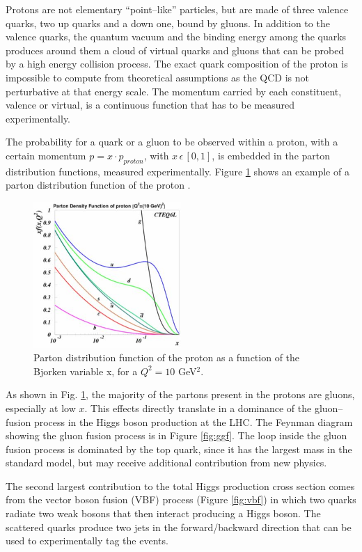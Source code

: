 Protons are not elementary ``point--like'' particles, but are made of three valence quarks, two up quarks and a down one, bound by gluons. In addition to the valence quarks, the quantum vacuum and the binding energy among the quarks produces around them a cloud of virtual quarks and gluons that can be probed by a high energy collision process. The exact quark composition of the proton is impossible to compute from theoretical assumptions as the QCD is not perturbative at that energy scale. The momentum carried by each constituent, valence or virtual, is a continuous function that has to be measured experimentally. 

The probability for a quark or a gluon to be observed within a proton, with a certain momentum $p = x \cdot p_{proton}$, with $x \, \epsilon \, [0,1]$, is embedded in the parton distribution functions, measured experimentally. Figure \ref{fig:pdf} shows an example of a parton distribution function of the proton \cite{Pumplin:2002vw}.

\begin{figure}
\centering
\includegraphics[width=0.5\textwidth]{1_Introduction_Th_and_Exp/pics/pdf.jpg}
\caption{Parton distribution function of the proton as a function of the Bjorken variable x, for a $Q^2=10$ GeV$^2$. }
\label{fig:pdf}
\end{figure}

As shown in Fig. \ref{fig:pdf}, the majority of the partons present in the protons are gluons, especially at low $x$. This effects directly translate in a dominance of the gluon--fusion process in the Higgs boson production at the LHC. The Feynman diagram showing the gluon fusion process is in Figure \ref{fig:ggf}. The loop inside the gluon fusion process is dominated by the top quark, since it has the largest mass in the standard model, but may receive additional contribution from new physics. 

The second largest contribution to the total Higgs production cross section comes from the vector boson fusion (VBF) process (Figure \ref{fig:vbf}) in which two quarks radiate two weak bosons that then interact producing a Higgs boson. The scattered quarks produce two jets in the forward/backward direction that can be used to experimentally tag the events.

